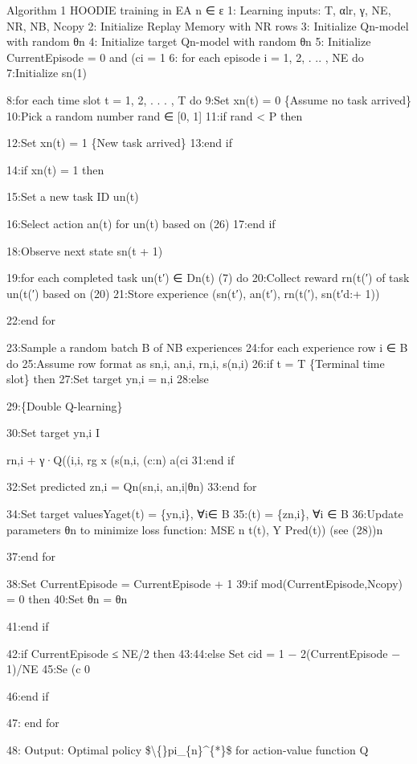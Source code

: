\documentclass{article}
\begin{document}
Algorithm 1 HOODIE training in EA n ∈ ε
1: Learning inputs: T, αlr, γ, NE, NR, NB, Ncopy 
2: Initialize Replay Memory with NR rows 
3: Initialize Qn-model with random θn 
4: Initialize target Qn-model with random θn 
5: Initialize CurrentEpisode = 0 and (ci = 1
6: for each episode i = 1, 2, . .. , NE do 
7:Initialize sn(1)

8:for each time slot t = 1, 2, . . . , T do 
9:Set xn(t) = 0 \{Assume no task arrived\}
10:Pick a random number rand ∈ [0, 1]
11:if rand < P then 

12:Set xn(t) = 1 \{New task arrived\}
13:end if 

14:if xn(t) = 1 then 

15:Set a new task ID un(t)

16:Select action an(t) for un(t) based on (26)
17:end if 

18:Observe next state sn(t + 1)

19:for each completed task un(t′) ∈ Dn(t) (7) do 
20:Collect reward rn(t(′) of task un(t(′) based on (20)
21:Store experience (sn(t′), an(t′), rn(t(′), sn(t′d:+
1))

22:end for 

23:Sample a random batch B of NB experiences 
24:for each experience row i ∈ B do 
25:Assume row format as sn,i, an,i, rn,i, s(n,i)
26:if t = T \{Terminal time slot\} then 
27:Set target yn,i = n,i 
28:else 

29:\{Double Q-learning\}

30:Set target yn,i I 

rn,i + γ·Q((i,i, rg x (s(n,i, (c:n)
a(ci 
31:end if 

32:Set predicted zn,i = Qn(sn,i, an,i|θn)
33:end for 

34:Set target valuesYaget(t) = \{yn,i\}, ∀i∈ B 
35:(t) = \{zn,i\}, ∀i ∈ B 
36:Update parameters θn to minimize loss function:
MSE n t(t), Y Pred(t)) (see (28))n 

37:end for 

38:Set CurrentEpisode = CurrentEpisode + 1
39:if mod(CurrentEpisode,Ncopy) = 0 then 
40:Set θn = θn 

41:end if 

42:if CurrentEpisode ≤ NE/2 then 
43:44:else Set cid = 1 − 2(CurrentEpisode − 1)/NE 
45:Se  (c   0

46:end if 

47: end for 

48: Output: Optimal policy \$\textbackslash\{\}pi\_\{n\}\textasciicircum{}\{*\}\$ for action-value function Q
\end{document}
